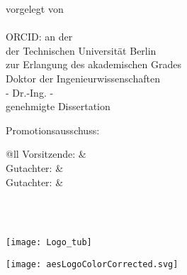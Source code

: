 {{\begin{titlepage}
\begin{center}
				\vfill
				\huge\textbf{\mytitle}
				\vfill
				\Large vorgelegt von\\
				\autor\\
				ORCID: \orcid
				\vfill
				an der \myfaculty \\
				der Technischen Universität Berlin\\
				zur Erlangung des akademischen Grades\\
				\vspace{0.5cm}
				Doktor der Ingenieurwissenschaften\\
				- Dr.-Ing. -\\
				\vspace{0.5cm}
				genehmigte Dissertation
			\end{center}
			\vfill
			\normalsize
			Promotionsausschuss:\\[2ex]
			\begin{tabular}{@{}ll}
			Vorsitzende: & \chairman \\
			Gutachter: & \firstreviewer \\
			Gutachter: & \secondreviewer \\
			\\[3ex]
			\end{tabular}
			\vfill
			\centering
			\myplace\ \the\year		
		\end{titlepage}
		}{
		\begin{titlepage}
			\begin{center}
				\begin{minipage}{0.2\textwidth}
					\centering
					\vfill	
					\texttt{[image: Logo\_tub]}
					\vfill
				\end{minipage}
				\hfill
				\begin{minipage}{0.7\textwidth}
					\centering
					\vfill
					\texttt{[image: aesLogoColorCorrected.svg]}
					\vfill
				\end{minipage}

\end{center}
\end{titlepage}}}
